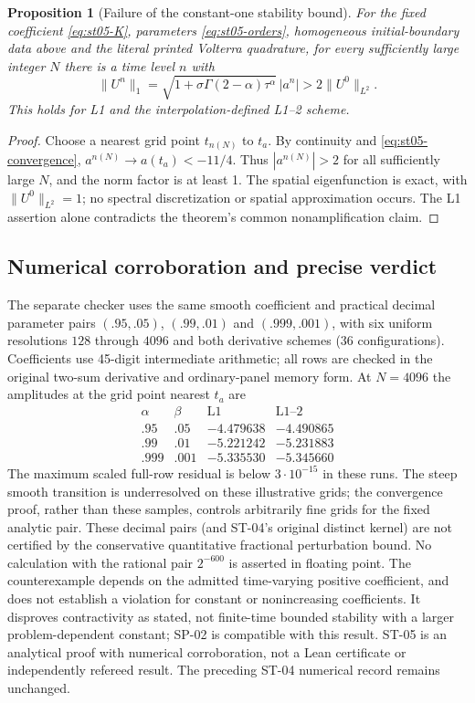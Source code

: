 \documentclass[11pt,a4paper]{amsart}
\theoremstyle{remark}
\theoremstyle{plain}
\newtheorem{proposition}{Proposition}[section]
\theoremstyle{remark}
\numberwithin{equation}{section}
\begin{document}
\begin{proposition}[Failure of the constant-one stability bound]\label{prop:st05}
For the fixed coefficient \eqref{eq:st05-K}, parameters \eqref{eq:st05-orders}, homogeneous initial-boundary data above and the literal printed Volterra quadrature, for every sufficiently large integer $N$ there is a time level $n$ with
\[
 \|U^n\|_1=\sqrt{1+\sigma\Gamma(2-\alpha)\tau^\alpha}\,|a^n|>2\|U^0\|_{L^2}.
\]
This holds for L1 and the interpolation-defined L1--2 scheme.
\end{proposition}
\begin{proof}
Choose a nearest grid point $t_{n(N)}$ to $t_a$. By continuity and \eqref{eq:st05-convergence}, $a^{n(N)}\to a(t_a)<-11/4$. Thus $|a^{n(N)}|>2$ for all sufficiently large $N$, and the norm factor is at least 1. The spatial eigenfunction is exact, with $\|U^0\|_{L^2}=1$; no spectral discretization or spatial approximation occurs. The L1 assertion alone contradicts the theorem's common nonamplification claim. \end{proof}

\subsection{Numerical corroboration and precise verdict}
The separate checker uses the same smooth coefficient and practical decimal parameter pairs $(.95,.05)$, $(.99,.01)$ and $(.999,.001)$, with six uniform resolutions $128$ through $4096$ and both derivative schemes (36 configurations). Coefficients use 45-digit intermediate arithmetic; all rows are checked in the original two-sum derivative and ordinary-panel memory form. At $N=4096$ the amplitudes at the grid point nearest $t_a$ are
\[
\begin{array}{cc|rr}
\alpha&\beta&\text{L1}&\text{L1--2}\\\hline
.95&.05&-4.479638&-4.490865\\
.99&.01&-5.221242&-5.231883\\
.999&.001&-5.335530&-5.345660
\end{array}
\]
The maximum scaled full-row residual is below $3\cdot10^{-15}$ in these runs. The steep smooth transition is underresolved on these illustrative grids; the convergence proof, rather than these samples, controls arbitrarily fine grids for the fixed analytic pair. These decimal pairs (and ST-04's original distinct kernel) are not certified by the conservative quantitative fractional perturbation bound. No calculation with the rational pair $2^{-600}$ is asserted in floating point. The counterexample depends on the admitted time-varying positive coefficient, and does not establish a violation for constant or nonincreasing coefficients. It disproves contractivity as stated, not finite-time bounded stability with a larger problem-dependent constant; SP-02 is compatible with this result. ST-05 is an analytical proof with numerical corroboration, not a Lean certificate or independently refereed result. The preceding ST-04 numerical record remains unchanged.
\end{document}
